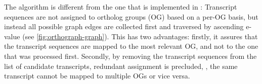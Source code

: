 The \pname algorithm is different from the one that is implemented in \hamstr:
Transcript sequences are not assigned to ortholog groups (OG) based on a per-OG
basis, but instead all possible graph edges are collected first and traversed by
ascending  e-value (see \autoref{fig:orthograph-graph}). This
has two advantages: firstly, it assures that the transcript sequences are mapped
to the most relevant OG, and not to the one that was processed first. Secondly,
by removing the transcript sequences from the list of candidate transcripts,
redundant assignment is precluded, \ie, the same transcript cannot be mapped to
multiple OGs or vice versa.
